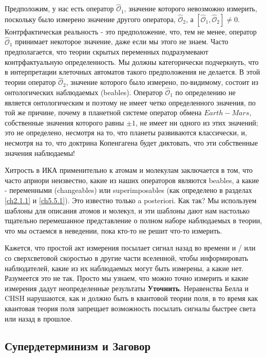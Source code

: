 \documentclass[main.tex]{subfiles}
\begin{document}
Предположим, у нас есть оператор $\hat{\mathcal O}_1$, значение которого невозможно измерить, поскольку было измерено значение другого оператора, $\hat{\mathcal O}_2$, а $ [\hat{\mathcal O}_1, \hat{\mathcal O}_2] \neq 0$. Контрфактическая реальность - это предположение, что, тем не менее, оператор $\hat{\mathcal O}_1$ принимает некоторое значение, даже если мы этого не знаем. Часто предполагается, что теории скрытых переменных подразумевают контрфактуальную определенность. Мы должны категорически подчеркнуть, что в интерпретации клеточных автоматов такого предположения не делается. В этой теории оператор $\hat{\mathcal O}_2$, значение которого было измерено, по-видимому, состоит из онтологических наблюдаемых (beables). Оператор $\hat{\mathcal O}_1$ по определению не является онтологическим и поэтому не имеет четко определенного значения, по той же причине, почему в планетной системе оператор обмена $Earth-Mars$, собственные значения которого равны $\pm 1$, не имеет ни одного из этих значений; это не определено, несмотря на то, что планеты развиваются классически, и, несмотря на то, что доктрина Копенгагена будет диктовать, что эти собственные значения наблюдаемы!

Хитрость в ИКА применительно к атомам и молекулам заключается в том, что часто априори неизвестно, какие из наших операторов являются beables, а какие - переменными (changeables) или superimposables (как определено в разделах \ref{ch2.1.1} и \ref{ch5.5.1}). Это известно только a posteriori. Как так? Мы используем шаблоны для описания атомов и молекул, и эти шаблоны дают нам настолько тщательно перемешанное представление о полном наборе наблюдаемых в теории, что мы остаемся в неведении, пока кто-то не решит что-то измерить.

Кажется, что простой акт измерения посылает сигнал назад во времени и / или со сверхсветовой скоростью в другие части вселенной, чтобы информировать наблюдателей, какие из их наблюдаемых могут быть измерены, а какие нет. Разумеется это не так. Просто мы узнаем, что можно точно измерить и какие измерения дадут неопределенные результаты \textbf{Уточнить}. Неравенства Белла и CHSH нарушаются, как и должно быть в квантовой теории поля, в то время как квантовая теория поля запрещает возможность посылать сигналы быстрее света или назад в прошлое.

\subsection{Супердетерминизм и Заговор}\label{ch10.3}
\end{document}
